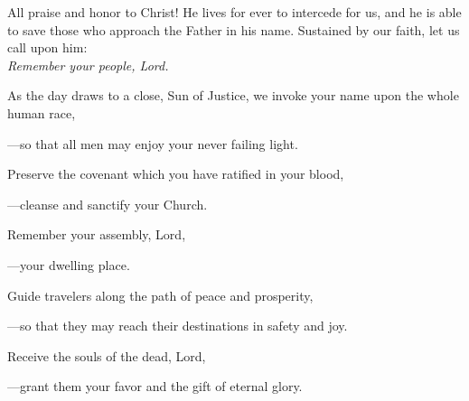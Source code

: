\intercessions\indent

\begin{hangpar}

All praise and honor to Christ! He lives for ever to intercede for us, and he is able to save those who approach the Father in his name. Sustained by our faith, let us call upon him:\\
\emph{Remember your people, Lord.}

\medskip As the day draws to a close, Sun of Justice, we invoke your name upon the whole human race,

{\color{red}---\thinspace}so that all men may enjoy your never failing light.

\medskip Preserve the covenant which you have ratified in your blood,

{\color{red}---\thinspace}cleanse and sanctify your Church.

\medskip Remember your assembly, Lord,

{\color{red}---\thinspace}your dwelling place.

\medskip Guide travelers along the path of peace and prosperity,

{\color{red}---\thinspace}so that they may reach their destinations in safety and joy.

\medskip Receive the souls of the dead, Lord,

{\color{red}---\thinspace}grant them your favor and the gift of eternal glory.

\end{hangpar}

